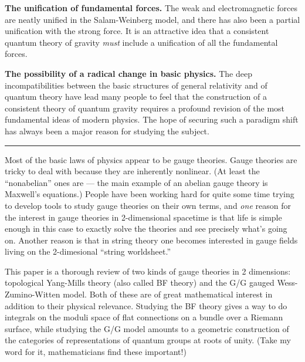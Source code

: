 \documentclass{article}
\def\tightlist{}
\renewcommand{\texttt}[1]{%
  \begingroup
  \ttfamily
  \begingroup\lccode`~=`/\lowercase{\endgroup\def~}{/\discretionary{}{}{}}%
  \begingroup\lccode`~=`[\lowercase{\endgroup\def~}{[\discretionary{}{}{}}%
  \begingroup\lccode`~=`.\lowercase{\endgroup\def~}{.\discretionary{}{}{}}%
  \catcode`/=\active\catcode`[=\active\catcode`.=\active
  \scantokens{#1\noexpand}%
  \endgroup
}
\begin{document}
\textbf{The unification of fundamental forces.} The weak and
electromagnetic forces are neatly unified in the Salam-Weinberg model,
and there has also been a partial unification with the strong force. It
is an attractive idea that a consistent quantum theory of gravity
\emph{must} include a unification of all the fundamental forces.

\textbf{The possibility of a radical change in basic physics.} The deep
incompatibilities between the basic structures of general relativity and
of quantum theory have lead many people to feel that the construction of
a consistent theory of quantum gravity requires a profound revision of
the most fundamental ideas of modern physics. The hope of securing such
a paradigm shift has always been a major reason for studying the
subject.

\begin{center}\rule{0.5\linewidth}{0.5pt}\end{center}


Most of the basic laws of physics appear to be gauge theories. Gauge
theories are tricky to deal with because they are inherently nonlinear.
(At least the ``nonabelian'' ones are --- the main example of an abelian
gauge theory is Maxwell's equations.) People have been working hard for
quite some time trying to develop tools to study gauge theories on their
own terms, and \emph{one} reason for the interest in gauge theories in
2-dimensional spacetime is that life is simple enough in this case to
exactly solve the theories and see precisely what's going on. Another
reason is that in string theory one becomes interested in gauge fields
living on the 2-dimesional ``string worldsheet.''

This paper is a thorough review of two kinds of gauge theories in 2
dimensions: topological Yang-Mills theory (also called BF theory) and
the G/G gauged Wess-Zumino-Witten model. Both of these are of great
mathematical interest in addition to their physical relevance. Studying
the BF theory gives a way to do integrals on the moduli space of flat
connections on a bundle over a Riemann surface, while studying the G/G
model amounts to a geometric construction of the categories of
representations of quantum groups at roots of unity. (Take my word for
it, mathematicians find these important!)
\end{document}
